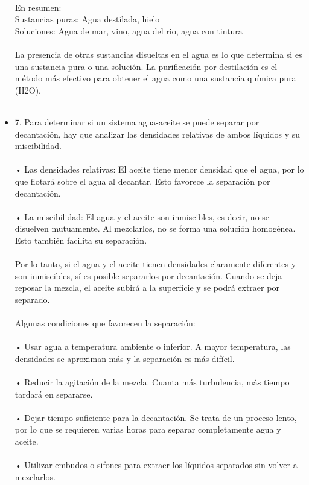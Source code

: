 \documentclass{article}
\begin{document}
\begin{itemize}
\\
En resumen:\\
Sustancias puras: Agua destilada, hielo\\
Soluciones: Agua de mar, vino, agua del rio, agua con tintura\\
\\
La presencia de otras sustancias disueltas en el agua es lo que determina si es una sustancia pura o una solución. La purificación por destilación es el método más efectivo para obtener el agua como una sustancia química pura (H2O).\\
\\
\item{7.}
Para determinar si un sistema agua-aceite se puede separar por decantación, hay que analizar las densidades relativas de ambos líquidos y su miscibilidad.\\
\\
• Las densidades relativas: El aceite tiene menor densidad que el agua, por lo que flotará sobre el agua al decantar. Esto favorece la separación por decantación.\\
\\
• La miscibilidad: El agua y el aceite son inmiscibles, es decir, no se disuelven mutuamente. Al mezclarlos, no se forma una solución homogénea. Esto también facilita su separación.\\
\\
Por lo tanto, si el agua y el aceite tienen densidades claramente diferentes y son inmiscibles, sí es posible separarlos por decantación. Cuando se deja reposar la mezcla, el aceite subirá a la superficie y se podrá extraer por separado.\\
\\
Algunas condiciones que favorecen la separación:\\
\\
• Usar agua a temperatura ambiente o inferior. A mayor temperatura, las densidades se aproximan más y la separación es más difícil.\\
\\
• Reducir la agitación de la mezcla. Cuanta más turbulencia, más tiempo tardará en separarse.\\
\\
• Dejar tiempo suficiente para la decantación. Se trata de un proceso lento, por lo que se requieren varias horas para separar completamente agua y aceite.\\
\\
• Utilizar embudos o sifones para extraer los líquidos separados sin volver a mezclarlos.\\

\end{itemize}
\end{document}
